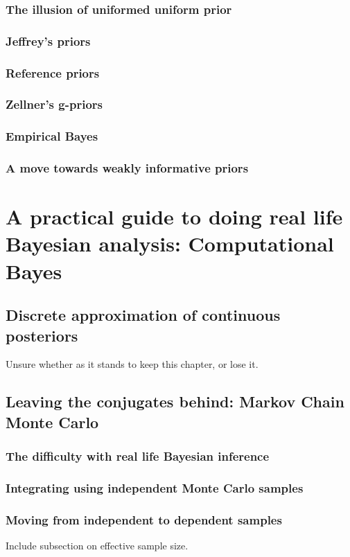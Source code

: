 \documentclass[11pt,fullpage]{book}
\begin{document}
\section{The illusion of uniformed uniform prior}
\section{Jeffrey's priors}
\section{Reference priors}
\section{Zellner's g-priors}
\section{Empirical Bayes}
\section{A move towards weakly informative priors}



\part{A practical guide to doing real life Bayesian analysis: Computational Bayes}\label{part:computationalBayes}

\chapter{Discrete approximation of continuous posteriors}
Unsure whether as it stands to keep this chapter, or lose it.

\chapter{Leaving the conjugates behind: Markov Chain Monte Carlo}

\section{The difficulty with real life Bayesian inference}
\section{Integrating using independent Monte Carlo samples}
\section{Moving from independent to dependent samples}
Include subsection on effective sample size.
\end{document}
